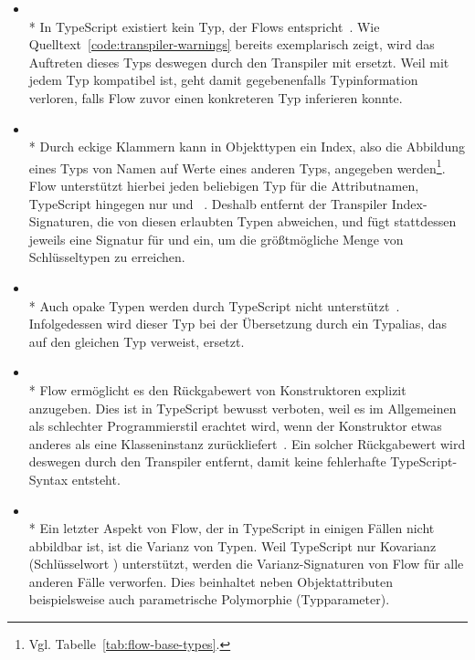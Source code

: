 \begin{itemize}
  \item {}\\*
    In TypeScript existiert kein Typ, der Flows  entspricht~\autocite{TS:GITHUB:NO_EXISTENTIAL_TYPE}. Wie Quelltext~\ref{code:transpiler-warnings} bereits exemplarisch zeigt, wird das Auftreten dieses Typs deswegen durch den Transpiler mit  ersetzt. Weil  mit jedem Typ kompatibel ist, geht damit gegebenenfalls Typinformation verloren, falls Flow zuvor einen konkreteren Typ inferieren konnte.
  \medbreak
  \item {}\\*
    Durch eckige Klammern kann in Objekttypen ein Index, also die Abbildung eines Typs von Namen auf Werte eines anderen Typs, angegeben werden\footnote{Vgl. Tabelle~\ref{tab:flow-base-types}.}. Flow unterstützt hierbei jeden beliebigen Typ für die Attributnamen, TypeScript hingegen nur  und ~\autocite{TS:HANDBOOK:INTERFACES}. Deshalb entfernt der Transpiler Index-Signaturen, die von diesen erlaubten Typen abweichen, und fügt stattdessen jeweils eine Signatur für  und  ein, um die größtmögliche Menge von Schlüsseltypen zu erreichen.
  \medbreak
  \item {}\\*
    Auch opake Typen werden durch TypeScript nicht unterstützt~\autocite{TS:GITHUB:NO_OPAQUE_TYPE}. Infolgedessen wird dieser Typ bei der Übersetzung durch ein Typalias, das auf den gleichen Typ verweist, ersetzt.
  \medbreak
  \item {}\\*
    Flow ermöglicht es den Rückgabewert von Konstruktoren explizit anzugeben. Dies ist in TypeScript bewusst verboten, weil es im Allgemeinen als schlechter Programmierstil erachtet wird, wenn der Konstruktor etwas anderes als eine Klasseninstanz zurückliefert~\autocite{TS:GITHUB:CONSTRUCTOR_RETURN_TYPE}. Ein solcher Rückgabewert wird deswegen durch den Transpiler entfernt, damit keine fehlerhafte TypeScript-Syntax entsteht.
  \medbreak
  \item {}\\*
    Ein letzter Aspekt von Flow, der in TypeScript in einigen Fällen nicht abbildbar ist, ist die Varianz von Typen. Weil TypeScript nur Kovarianz (Schlüsselwort ) unterstützt, werden die Varianz-Signaturen von Flow für alle anderen Fälle verworfen. Dies beinhaltet neben Objektattributen beispielsweise auch parametrische Polymorphie (Typparameter).
\end{itemize}

